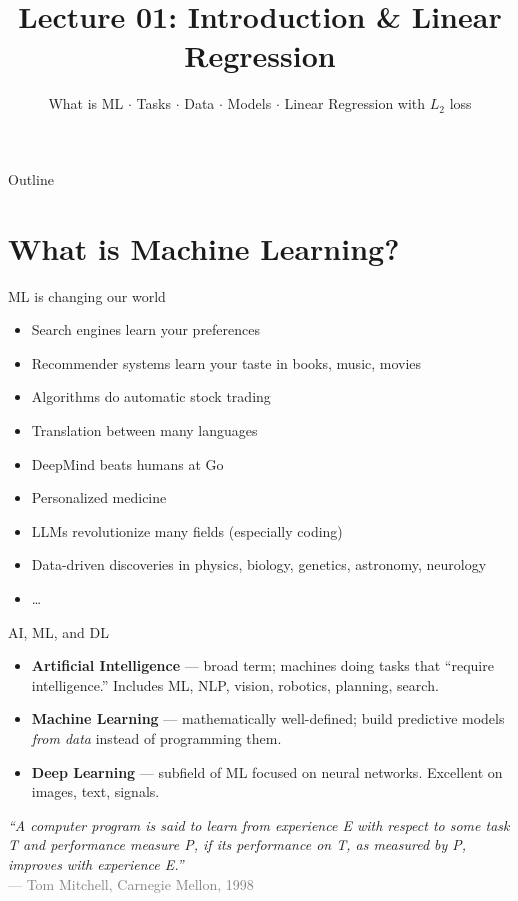 \documentclass[aspectratio=169]{beamer}
\title{Lecture 01: Introduction \& Linear Regression}
\subtitle{What is ML $\cdot$ Tasks $\cdot$ Data $\cdot$ Models $\cdot$ Linear Regression with $L_2$ loss}
\date{}
\begin{document}
\begin{frame}{Outline}
  \tableofcontents
\end{frame}

\section{What is Machine Learning?}

\begin{frame}{ML is changing our world}
  \begin{itemize}
    \item Search engines learn your preferences
    \item Recommender systems learn your taste in books, music, movies
    \item Algorithms do automatic stock trading
    \item Translation between many languages
    \item DeepMind beats humans at Go
    \item Personalized medicine
    \item LLMs revolutionize many fields (especially coding)
    \item Data-driven discoveries in physics, biology, genetics, astronomy, neurology
    \item \dots
  \end{itemize}
\end{frame}

\begin{frame}{AI, ML, and DL}
  \begin{itemize}
    \item \textbf{Artificial Intelligence} — broad term; machines doing tasks that ``require intelligence.'' Includes ML, NLP, vision, robotics, planning, search.
    \item \textbf{Machine Learning} — mathematically well-defined; build predictive models \emph{from data} instead of programming them.
    \item \textbf{Deep Learning} — subfield of ML focused on neural networks. Excellent on images, text, signals.
  \end{itemize}
  \vfill
  \textit{``A computer program is said to learn from experience E with respect to some task T and performance measure P, if its performance on T, as measured by P, improves with experience E.''}\\
  \textcolor{gray}{\small — Tom Mitchell, Carnegie Mellon, 1998}
\end{frame}
\end{document}
